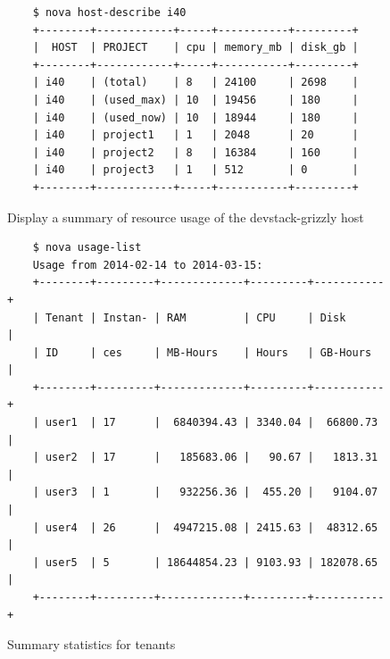 \documentclass{sig-alternate-05-2015}
\begin{document}
\begin{figure}[htb]
\begin{scriptsize}
\begin{verbatim}
    $ nova host-describe i40
    +--------+------------+-----+-----------+---------+
    |  HOST  | PROJECT    | cpu | memory_mb | disk_gb |
    +--------+------------+-----+-----------+---------+
    | i40    | (total)    | 8   | 24100     | 2698    |
    | i40    | (used_max) | 10  | 19456     | 180     |
    | i40    | (used_now) | 10  | 18944     | 180     |
    | i40    | project1   | 1   | 2048      | 20      |
    | i40    | project2   | 8   | 16384     | 160     |
    | i40    | project3   | 1   | 512       | 0       |
    +--------+------------+-----+-----------+---------+
\end{verbatim}
\vspace{-20pt}
\end{scriptsize}

\caption{Display a summary of resource usage of the devstack-grizzly host}
\label{F:host-describe}

\begin{scriptsize}
\begin{verbatim}
    $ nova usage-list
    Usage from 2014-02-14 to 2014-03-15:
    +--------+---------+-------------+---------+-----------+
    | Tenant | Instan- | RAM         | CPU     | Disk      |
    | ID     | ces     | MB-Hours    | Hours   | GB-Hours  |
    +--------+---------+-------------+---------+-----------+
    | user1  | 17      |  6840394.43 | 3340.04 |  66800.73 |
    | user2  | 17      |   185683.06 |   90.67 |   1813.31 |
    | user3  | 1       |   932256.36 |  455.20 |   9104.07 |
    | user4  | 26      |  4947215.08 | 2415.63 |  48312.65 |
    | user5  | 5       | 18644854.23 | 9103.93 | 182078.65 |
    +--------+---------+-------------+---------+-----------+
\end{verbatim}
\vspace{-20pt}
\end{scriptsize}

\caption{Summary statistics for tenants}
\label{F:host-describe}

\end{figure}
\end{document}

